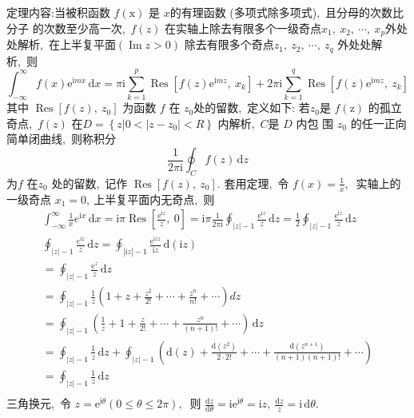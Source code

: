 \begin{solution}
		定理内容:当被积函数 $ f(\mathrm{x}) $ 是  $x  $的有理函数 (多项式除多项式),\  且分母的次数比分子 的次数至少高一次,\   $f(z) $ 在实轴上除去有限多个一级奇点$ x_{1},\  x_{2},\  \cdots,\  x_{p}  $外处处解析,\  在上半复平面$  (\operatorname{Im} z>0) $ 除去有限多个奇点$z_{1},\  z_{2},\  \cdots,\ z_{q} $ 外处处解析,\  则
		$$\int_{-\infty}^{\infty} f(x) \mathrm{e}^{\mathrm{i}mx}\,\mathrm{d}x=\pi \mathrm{i} \sum_{k=1}^{p} \operatorname{Res}\left[f(z) \mathrm{e}^{\mathrm{i}mz},\  x_{k}\right]+2 \pi \mathrm{i} \sum_{k=1}^{q} \operatorname{Res}\left[f(z) \mathrm{e}^{\mathrm{i}mz},\  z_{k}\right]$$
		其中 $ \operatorname{Res}\left[f(z),\ z_{0}\right] $ 为函数 $ f $ 在 $ z_{0}  $处的留数,\  定义如下:
		若$z_{0}  $是  $f(\mathrm{z})$  的孤立奇点,\   $f(z) $ 在$  D=\left\{z|0<| z-z_{0} \mid<R\right\} $ 内解析,\  $C $是 $ D $ 内包 围 $ z_{0} $ 的任一正向简单闭曲线,\  则称积分
		$$\frac{1}{2 \pi \mathrm{i}} \oint_{C} f(z)\,\mathrm{d}z$$
		为$ f$ 在$ z_{0}$  处的留数,\  记作  $\operatorname{Res}\left[f(z),\  z_{0}\right] .$
		套用定理,\  令  $f(x)=\frac{1}{x} ,\ $ 实轴上的一级奇点  $x_{1}=0 ,\  $上半复平面内无奇点,\  则
		$$\begin{array}{l}
			\int_{-\infty}^{\infty} \frac{1}{x} e^{\mathrm{i}x} \,\mathrm{d}x=\mathrm{i} \pi \operatorname{Res}\left[\frac{\mathrm{e}^{\mathrm{i}z}}{z},\  0\right]=\mathrm{i} \pi \frac{1}{2 \pi \mathrm{i}} \oint_{|z|-1} \frac{\mathrm{e}^{\mathrm{i}z}}{z}\,\mathrm{d}z=\frac{1}{2} \oint_{|z|-1} \frac{\mathrm{e}^{\mathrm{i}z}}{z}\,\mathrm{d}z \\
			\oint_{|z|-1} \frac{e^{\mathrm{i}z}}{z} \,\mathrm{d}z=\oint_{|\mathrm{i}z|-1} \frac{\mathrm{e}^{\mathrm{i}z z}}{\mathrm{i}z}\,\mathrm{d}(\mathrm{i}z) \\
			=\oint_{|z|-1} \frac{\mathrm{e}^{z}}{z} \,\mathrm{d}z \\
			=\oint_{|z|-1} \frac{1}{z}\left(1+z+\frac{z^{2}}{2 !}+\cdots+\frac{z^{n}}{n !}+\cdots\right) d z \\
			=\oint_{|z|-1}\left(\frac{1}{z}+1+\frac{z}{2 !}+\cdots+\frac{z^{n}}{(n+1)!}+\cdots\right) \,\mathrm{d}z \\
			=\oint_{|z|-1} \frac{1}{z} \,\mathrm{d} z+\oint_{|z|-1}\left(\mathrm{d}(z)+\frac{\mathrm{d}\left(z^{2}\right)}{2 \cdot 2 !}+\cdots+\frac{\mathrm{d}\left(z^{n+1}\right)}{(n+1)(n+1) !}+\cdots\right) \\
			=\oint_{|z|-1} \frac{1}{z}\,\mathrm{d}z \\
		\end{array}$$
		三角换元,\  令 $z=\mathrm{e}^{\mathrm{i} \theta}(0 \leq \theta \leq 2 \pi) ,\ $ 则  $\frac{\mathrm{d}z}{\mathrm{d} \theta}=\mathrm{ie}^{\mathrm{i} \theta}=\mathrm{i}z,\  \frac{\mathrm{d}z}{z}=\mathrm{i}\,\mathrm{d} \theta .$

\end{solution}
